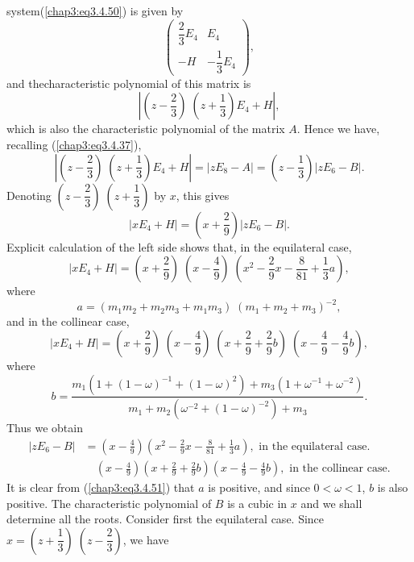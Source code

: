 system\break (\ref{chap3:eq3.4.50}) is given by  
$$
\begin{pmatrix}
\dfrac{2}{3} E_4 & E_4\\
- H & -\dfrac{1}{3} E_4 
\end{pmatrix},
$$
and the\pageoriginale characteristic polynomial of this matrix is
$$
\left| \left(z - \frac{2}{3} \right) \; \left(z + \frac{1}{3} \right) E_4 + H \right|, 
$$
which  is also the characteristic polynomial of the matrix $A$. Hence
we have, recalling (\ref{chap3:eq3.4.37}), 
$$
\left| \left(z - \frac{2}{3} \right) \; \left(z + \frac{1}{3} \right)
E_4 + H\right|  = \left|z E_8 - A \right| = \left(z - \frac{1}{3}
\right) \left| z E_6 - B\right|.  
$$ 
Denoting $\left(z -\dfrac{2}{3} \right) \; \left(z+ \dfrac{1}{3}
\right)$ by $x$, this gives  
$$
\left| x E_4 + H\right|  = \left(x+ \frac{2}{9} \right) \left|z E_6 -
B \right|.  
$$
Explicit calculation of the left side shows that, in the equilateral
case,  
$$
|xE_4 + H| = \left(x + \frac{2}{9} \right) \; \left(x - \frac{4}{9}
\right) \; \left(x^2 - \frac{2}{9} x- \frac{8}{81} + \frac{1}{3}a
\right),  
$$
where 
\begin{equation*}
a = (m_1 m_2 + m_2 m_3 + m_1 m_3 ) \; (m_1 + m_2 + m_3)^{-2},
\tag{3.4.51}\label{chap3:eq3.4.51} 
\end{equation*}
and in the collinear case, 
$$
|xE_4 + H| = \left(x + \frac{2}{9} \right) \; \left(x - \frac{4}{9}
\right) \; \left(x+\frac{2}{9} + \frac{2}{9} b \right) \; \left(x -
\frac{4}{9} - \frac{4}{9} b \right),  
$$
where 
\begin{equation*}
b = \frac{m_1(1 + (1-\omega)^{-1} + (1-\omega)^2) + m_3 (1+
  \omega^{-1} + \omega^{-2})}{m_1 + m_2 (\omega^{-2} + (1-\omega)^{-2}
  ) + m_3}. \tag{3.4.52}\label{chap3:eq3.4.52} 
\end{equation*}
Thus we obtain
\begin{align*}
|zE_6 - B| & = \left(x-\frac{4}{9} \right) \left(x^2 - \frac{2}{9} x -
\frac{8}{81} + \frac{1}{3}a \right), \text{ in the equilateral
  case. }\\ 
& \quad \left(x-\frac{4}{9} \right) \left(x + \frac{2}{9} +
\frac{2}{9}b \right) \left(x-\frac{4}{9} -\frac{4}{9} b \right),
\text{ in the collinear case.} 
\end{align*}\pageoriginale 
It is clear from (\ref{chap3:eq3.4.51}) that $a$ is positive, and
since $0< \omega <1$, $b$ is also positive. The characteristic
polynomial of $B$ is a cubic in $x$ and we shall determine all the
roots. Consider first the equilateral case. Since $x= (z+\dfrac{1}{3})
\; (z -\dfrac{2}{3})$, we have 
